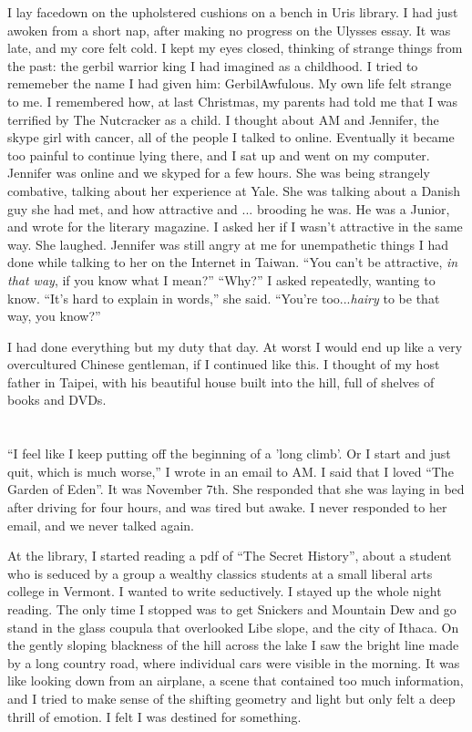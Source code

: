 I lay facedown on the upholstered cushions on a bench in Uris library.  I had
just awoken from a short nap, after making no progress on the Ulysses essay.  It
was late, and my core felt cold.  I kept my eyes closed, thinking of strange
things from the past: the gerbil warrior king I had imagined as a childhood.  I
tried to rememeber the name I had given him: GerbilAwfulous.  My own life felt
strange to me.  I remembered how, at last Christmas, my parents had told me that
I was terrified by The Nutcracker as a child.  I thought about AM and Jennifer,
the skype girl with cancer, all of the people I talked to online.  Eventually it
became too painful to continue lying there, and I sat up and went on my
computer.  Jennifer was online and we skyped for a few hours.  She was being
strangely combative, talking about her experience at Yale.  She was talking
about a Danish guy she had met, and how attractive and ... brooding he was.  He
was a Junior, and wrote for the literary magazine.  I asked her if I wasn't
attractive in the same way.  She laughed.  Jennifer was still angry at me for
unempathetic things I had done while talking to her on the Internet in Taiwan.
``You can't be attractive, \textit{in that way}, if you know what I mean?''
``Why?'' I asked repeatedly, wanting to know. ``It's hard to explain in words,''
she said.  ``You're too...\textit{hairy} to be that way, you know?''

I had done everything but my duty that day.  At worst I would end up like a very
overcultured Chinese gentleman, if I continued like this.  I thought of my host
father in Taipei, with his beautiful house built into the hill, full of shelves
of books and DVDs.  

\section{}

``I feel like I keep putting off the beginning of a 'long climb'.  Or I start
and just quit, which is much worse,'' I wrote in an email to AM.  I said that I
loved ``The Garden of Eden''.  It was November 7th. She responded that she was
laying in bed after driving for four hours, and was tired but awake.  I never
responded to her email, and we never talked again.

At the library, I started reading a pdf of ``The Secret History'', about a
student who is seduced by a group a wealthy classics students at a small liberal
arts college in Vermont.  I wanted to write seductively.  I stayed up the whole
night reading.  The only time I stopped was to get Snickers and Mountain Dew and
go stand in the glass coupula that overlooked Libe slope, and the city of
Ithaca.  On the gently sloping blackness of the hill across the lake I saw the
bright line made by a long country road, where individual cars were visible in
the morning.  It was like looking down from an airplane, a scene that contained
too much information, and I tried to make sense of the shifting geometry and
light but only felt a deep thrill of emotion.  I felt I was destined for
something.  

